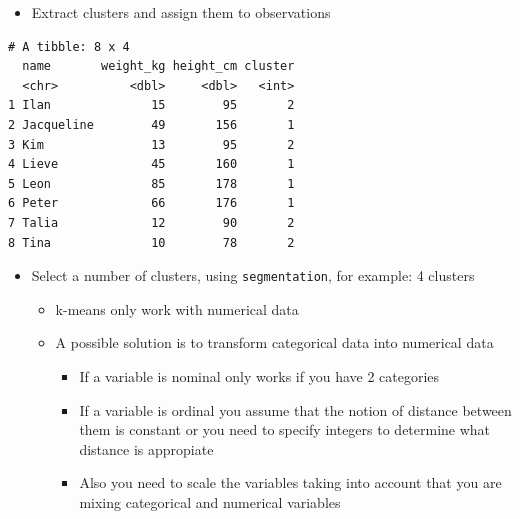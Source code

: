 \documentclass[
  ignorenonframetext,
]{beamer}
\newenvironment{Shaded}{\begin{snugshade}}{\end{snugshade}}
\newcommand{\AttributeTok}[1]{\textcolor[rgb]{0.40,0.45,0.13}{#1}}
\newcommand{\FunctionTok}[1]{\textcolor[rgb]{0.28,0.35,0.67}{#1}}
\newcommand{\NormalTok}[1]{\textcolor[rgb]{0.00,0.23,0.31}{#1}}
\newcommand{\OtherTok}[1]{\textcolor[rgb]{0.00,0.23,0.31}{#1}}
\newcommand{\SpecialCharTok}[1]{\textcolor[rgb]{0.37,0.37,0.37}{#1}}
\providecommand{\tightlist}{%
  \setlength{\itemsep}{0pt}\setlength{\parskip}{0pt}}\usepackage{longtable,booktabs,array}
\begin{document}
\begin{frame}[fragile]{}
\label{section-44}
\begin{itemize}
\tightlist
\item
  Extract clusters and assign them to observations
\end{itemize}

\tiny

\begin{Shaded}
\end{Shaded}

\begin{verbatim}
# A tibble: 8 x 4
  name       weight_kg height_cm cluster
  <chr>          <dbl>     <dbl>   <int>
1 Ilan              15        95       2
2 Jacqueline        49       156       1
3 Kim               13        95       2
4 Lieve             45       160       1
5 Leon              85       178       1
6 Peter             66       176       1
7 Talia             12        90       2
8 Tina              10        78       2
\end{verbatim}
\end{frame}

\begin{frame}[fragile]{}
\label{section-45}
\begin{itemize}
\item
  Select a number of clusters, using \texttt{segmentation}, for example:
  4 clusters

  \begin{itemize}
  \item
    k-means only work with numerical data
  \item
    A possible solution is to transform categorical data into numerical
    data

    \begin{itemize}
    \tightlist
    \item
      If a variable is nominal only works if you have 2 categories
    \item
      If a variable is ordinal you assume that the notion of distance
      between them is constant or you need to specify integers to
      determine what distance is appropiate
    \item
      Also you need to scale the variables taking into account that you
      are mixing categorical and numerical variables
    \end{itemize}
  \end{itemize}
\end{itemize}
\end{frame}
\end{document}
